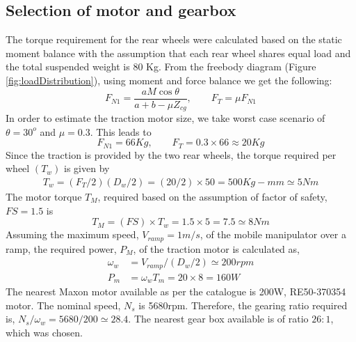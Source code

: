  

 \subsection {Selection of motor and gearbox}
 The torque requirement for the rear wheels were calculated based on the static moment balance with the assumption that each rear wheel shares equal load and the total suspended weight is 80 Kg. From the freebody diagram (Figure   \ref{fig:loadDistribution}), using moment and force balance  we get the following:
\begin{equation}
\label{eqn:t1}
F_{N1}=\frac{a M \cos \theta}{a+b-\mu Z_{cg}} , \quad \quad
F_T=\mu F_{N1}
\end{equation}
In order to estimate the traction motor size, we take worst case scenario of $\theta=30^o$ and $\mu =0.3$. This leads to
\begin{equation*}
F_{N1}=66 Kg, \quad\quad F_T=0.3\times 66 \approx 20Kg
\end{equation*}
 Since the traction is provided by the two rear wheels, the torque required per wheel $(T_w)$ is given by
\begin{eqnarray}
T_w=(F_T/2)(D_w/2)= (20/2) \times 50=500 Kg-mm \simeq 5 Nm
\end{eqnarray}
The motor torque $T_M$, required based on the assumption of factor of safety, $FS=1.5$ is
\begin{equation}
T_M=(FS)\times T_w=1.5\times 5 =7.5 \simeq 8Nm
\end{equation}
 Assuming the maximum speed, $V_{ramp}=1m/s$, of the mobile manipulator over a ramp, the required power, $P_M$, of the traction motor is calculated as,
 \begin{equation}
 \begin{aligned}
\omega_w&=V_{ramp}/(D_w/2) \simeq 200rpm\\
P_m&=\omega_w T_m=20\times 8=160W
 \end{aligned}
 \end{equation}
 The nearest Maxon motor available as per the catalogue \cite{catMaxon} is 200W,  RE50-370354 motor.  The nominal speed, $N_s$ is 5680rpm. Therefore, the  gearing  ratio required is, $N_s/\omega_w=5680/200 \simeq 28.4$. The nearest gear box available  is of ratio $26:1$, which was chosen. 

